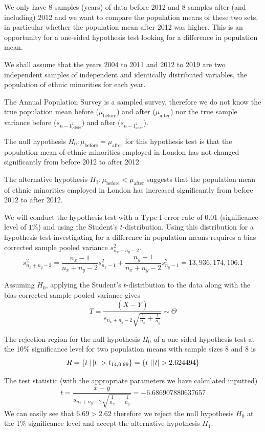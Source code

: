 \documentclass[12pt,twoside]{article}
\begin{document}
We only have 8 samples (years) of data before 2012 and 8 samples after (and including) 2012 and we want to compare the population means of these two sets, in particular whether the population mean after 2012 was higher. This is an opportunity for a one-sided hypothesis test looking for a difference in population mean.

We shall assume that the years 2004 to 2011 and 2012 to 2019 are two independent samples of independent and identically distributed variables, the population of ethnic minorities for each year.

The Annual Population Survey is a sampled survey, therefore we do not know the true population mean before ($\mu_\text{before}$) and after ($\mu_\text{after}$) nor the true sample variance before ($s_{n-1}_\text{before}^2$) and after ($s_{n-1}_\text{after}^2$).

The null hypothesis $H_0: \mu_\text{before} = \mu_\text{after}$ for this hypothesis test is that the population mean of ethnic minorities employed in London has not changed significantly from before 2012 to after 2012.

The alternative hypothesis $H_1: \mu_\text{before} < \mu_\text{after}$ suggests that the population mean of ethnic minorities employed in London has increased significantly from before 2012 to after 2012.

We will conduct the hypothesis test with a Type I error rate of 0.01 (significance level of $1\%$) and using the Student's $t$-distribution. Using this distribution for a hypothesis test investigating for a difference in population means requires a bias-corrected sample pooled variance $s_{n_x+n_y-2}^2$.
$$s_{n_x+n_y-2}^2 = \frac{n_x-1}{n_x+n_y-2}s_{n_x-1}^2 + \frac{n_y-1}{n_x+n_y-2}s_{n_y-1}^2 = 13,936,174,106.1$$

Assuming $H_0$, applying the Student's $t$-distribution to the data along with the bias-corrected sample pooled variance gives
$$T = \frac{(\overline{X}-\overline{Y})}{s_{n_x+n_y-2}\sqrt{\frac{1}{n_x}+\frac{1}{n_y}}} \sim \Theta$$

The rejection region for the null hypothesis $H_0$ of a one-sided hypothesis test at the 10\% significance level for two population means with sample sizes 8 and 8 is
$$R=\{t\mid\abs{t}>t_{14\text{,}0.99}\}=\{t\mid\abs{t}>2.624494\}$$

The test statistic (with the appropriate parameters we have calculated inputted)
$$t=\frac{\overline{x}-\overline{y}}{s_{n_x+n_y-2}\sqrt{\frac{1}{n_x}+\frac{1}{n_y}}}=-6.686907880637657$$
We can easily see that $6.69 > 2.62$ therefore we reject the null hypothesis $H_0$ at the 1\% significance level and accept the alternative hypothesis $H_1$.
\end{document}
